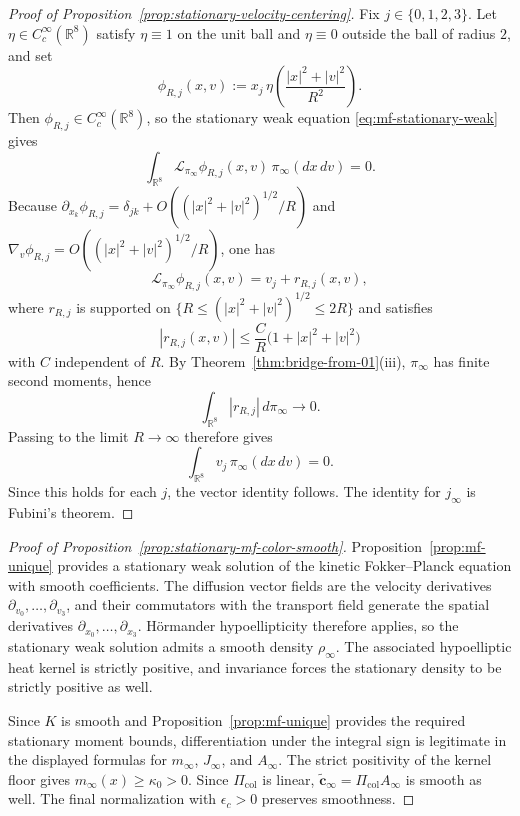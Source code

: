 \documentclass[11pt]{article}
\theoremstyle{definition}
\theoremstyle{remark}
\newcommand{\R}{\mathbb R}
\begin{document}
\begin{proof}[Proof of Proposition~\ref{prop:stationary-velocity-centering}]
Fix \(j\in\{0,1,2,3\}\). Let \(\eta\in C_c^\infty(\R^8)\) satisfy
\(\eta\equiv1\) on the unit ball and \(\eta\equiv0\) outside the ball of radius
\(2\), and set
\[
\phi_{R,j}(x,v):=x_j\,\eta\!\left(\frac{|x|^2+|v|^2}{R^2}\right).
\]
Then \(\phi_{R,j}\in C_c^\infty(\R^8)\), so the stationary weak equation
\eqref{eq:mf-stationary-weak} gives
\[
\int_{\R^8}\mathcal L_{\pi_\infty}\phi_{R,j}(x,v)\,\pi_\infty(dx\,dv)=0.
\]
Because \(\partial_{x_k}\phi_{R,j}=\delta_{jk}+O((|x|^2+|v|^2)^{1/2}/R)\) and
\(\nabla_v\phi_{R,j}=O((|x|^2+|v|^2)^{1/2}/R)\), one has
\[
\mathcal L_{\pi_\infty}\phi_{R,j}(x,v)=v_j+r_{R,j}(x,v),
\]
where \(r_{R,j}\) is supported on
\(\{R\le (|x|^2+|v|^2)^{1/2}\le 2R\}\) and satisfies
\[
|r_{R,j}(x,v)|\le \frac{C}{R}\bigl(1+|x|^2+|v|^2\bigr)
\]
with \(C\) independent of \(R\). By Theorem~\ref{thm:bridge-from-01}\textnormal{(iii)},
\(\pi_\infty\) has finite second moments, hence
\[
\int_{\R^8}|r_{R,j}|\,d\pi_\infty\to0.
\]
Passing to the limit \(R\to\infty\) therefore gives
\[
\int_{\R^8} v_j\,\pi_\infty(dx\,dv)=0.
\]
Since this holds for each \(j\), the vector identity follows. The identity for
\(j_\infty\) is Fubini's theorem.
\end{proof}

\begin{proof}[Proof of Proposition~\ref{prop:stationary-mf-color-smooth}]
Proposition~\ref{prop:mf-unique} provides a stationary weak solution of the
kinetic Fokker--Planck equation with smooth coefficients. The diffusion vector
fields are the velocity derivatives \(\partial_{v_0},\dots,\partial_{v_3}\),
and their commutators with the transport field generate the spatial derivatives
\(\partial_{x_0},\dots,\partial_{x_3}\). Hörmander hypoellipticity
therefore applies, so the stationary weak solution admits a smooth density
\(\rho_\infty\). The associated hypoelliptic heat kernel is strictly positive,
and invariance forces the stationary density to be strictly positive as well.

Since \(K\) is smooth and Proposition~\ref{prop:mf-unique}
provides the required stationary moment bounds, differentiation under the
integral sign is legitimate in the displayed formulas for \(m_\infty\),
\(J_\infty\), and \(A_\infty\). The strict positivity of the kernel floor gives
\(m_\infty(x)\ge\kappa_0>0\). Since \(\Pi_{\mathrm{col}}\) is linear,
\(\tilde{\mathbf c}_\infty=\Pi_{\mathrm{col}}A_\infty\) is smooth as well.
The final normalization with
\(\epsilon_c>0\) preserves smoothness.
\end{proof}
\end{document}
